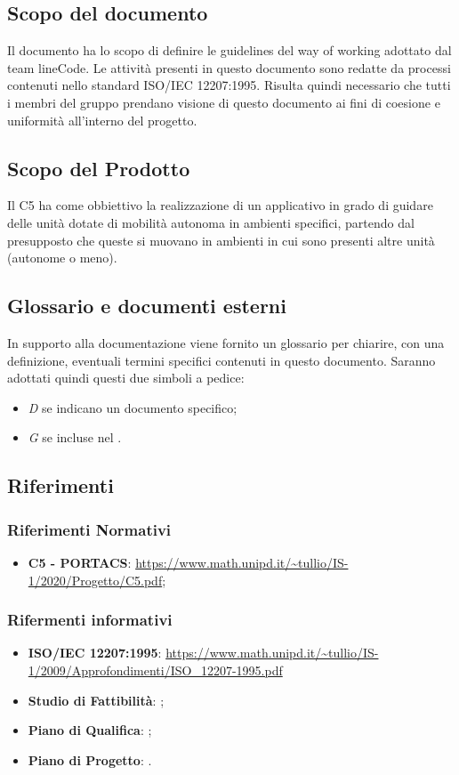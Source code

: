 \subsection{Scopo del documento}
Il documento ha lo scopo di definire le guidelines del way of working adottato dal team lineCode. Le attività presenti in questo documento sono redatte da processi contenuti nello standard ISO/IEC 12207:1995. Risulta quindi necessario che tutti i membri del gruppo prendano visione di questo documento ai fini di coesione e uniformità all'interno del progetto.

\subsection{Scopo del Prodotto}
Il  C5 ha come obbiettivo la realizzazione di un applicativo  in grado di guidare delle unità dotate di mobilità autonoma in ambienti specifici, partendo dal presupposto che queste si muovano in ambienti in cui sono presenti altre unità (autonome o meno).

\subsection{Glossario e documenti esterni}
In supporto alla documentazione viene fornito un glossario per chiarire, con una definizione, eventuali termini specifici contenuti in questo documento.
Saranno adottati quindi questi due simboli a pedice:
\begin{itemize}
	\item \textit{D} se indicano un documento specifico;
	\item \textit{G} se incluse nel .
\end{itemize}

\subsection{Riferimenti}
	\subsubsection{Riferimenti Normativi}
	\begin{itemize}
		\item \textbf{{ C5 - PORTACS}}: \url{https://www.math.unipd.it/~tullio/IS-1/2020/Progetto/C5.pdf};
	\end{itemize}
	\subsubsection{Rifermenti informativi}
	\begin{itemize}
		\item \textbf{ISO/IEC 12207:1995}: \url{https://www.math.unipd.it/~tullio/IS-1/2009/Approfondimenti/ISO_12207-1995.pdf}
		\item \textbf{Studio di Fattibilità}: ; %
		\item \textbf{Piano di Qualifica}: ;
		\item \textbf{Piano di Progetto}: .
	\end{itemize}